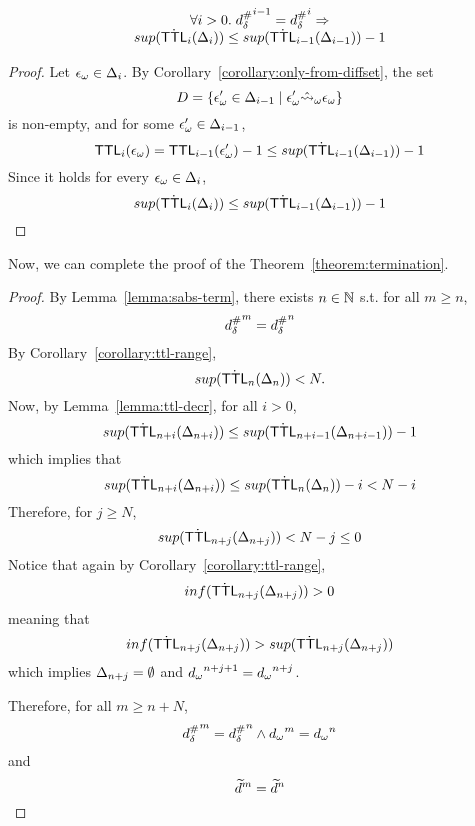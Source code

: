 \begin{lemma}\label{lemma:ttl-decr}
  \[
    \begin{array}{c}
      \forall i > 0. \; {{d}^{\#}_\delta}^{i-1} = {{d}^{\#}_\delta}^i \Rightarrow \\
      sup(\dot {\textsf{TTL}}_i(\Delta_i)) \leq sup(\dot {\textsf{TTL}}_{i-1}(\Delta_{i-1})) - 1
    \end{array}
  \]
\end{lemma}
\begin{proof}
  Let ${\epsilon}_\omega \in \Delta_i$.
  By Corollary~\ref{corollary:only-from-diffset}, the set
  \[
    D = \{{\epsilon}_\omega' \in \Delta_{i-1} \mid {\epsilon}_\omega' \hat{\leadsto}_\omega {\epsilon}_\omega\}
  \]
  is non-empty, and for some ${\epsilon}_\omega' \in \Delta_{i-1}$,
  \[
    \textsf{TTL}_i({\epsilon}_\omega) = \textsf{TTL}_{i-1}({\epsilon}_\omega') - 1 \leq sup(\dot {\textsf{TTL}}_{i-1}(\Delta_{i-1})) - 1
  \]
  Since it holds for every ${\epsilon}_\omega \in \Delta_i$,
  \[
    sup(\dot {\textsf{TTL}}_i(\Delta_i)) \leq sup(\dot {\textsf{TTL}}_{i-1}(\Delta_{i-1})) - 1
  \]
\end{proof}

Now, we can complete the proof of the Theorem~\ref{theorem:termination}.

\begin{proof}
By Lemma~\ref{lemma:sabs-term}, there exists $n \in \mathbb{N}$ s.t.
for all $m \geq n$,
\[
  {{d}^{\#}_\delta}^m = {{d}^{\#}_\delta}^n
\]
By Corollary~\ref{corollary:ttl-range},
\[
  sup(\dot {\textsf{TTL}}_n(\Delta_n)) < N.
\]
Now, by Lemma~\ref{lemma:ttl-decr}, for all $i>0$,
\[
  sup(\dot {\textsf{TTL}}_{n+i}(\Delta_{n+i})) \leq sup(\dot {\textsf{TTL}}_{n+i-1}(\Delta_{n+i-1})) - 1
\]
which implies that
\[
  sup(\dot {\textsf{TTL}}_{n+i}(\Delta_{n+i})) \leq sup(\dot {\textsf{TTL}}_n(\Delta_n)) - i < N - i
\]
Therefore, for $j \geq N$,
\[
  sup(\dot {\textsf{TTL}}_{n+j}(\Delta_{n+j})) < N - j \leq 0
\]
Notice that again by Corollary~\ref{corollary:ttl-range},
\[
  inf(\dot {\textsf{TTL}}_{n+j}(\Delta_{n+j})) > 0
\]
meaning that
\[
  inf(\dot {\textsf{TTL}}_{n+j}(\Delta_{n+j})) > sup(\dot {\textsf{TTL}}_{n+j}(\Delta_{n+j}))
\]
which implies $\Delta_{n+j} = \emptyset$ and
${{d}_\omega}^{n+j+1} = {{d}_\omega}^{n+j}$.

Therefore, for all $m \geq n + N$,
\[
  {{d}^{\#}_\delta}^m = {{d}^{\#}_\delta}^n \wedge {{d}_\omega}^m = {{d}_\omega}^n
\]
and
\[
  \widetilde{d}^m = \widetilde{d}^n
\]

\end{proof}
